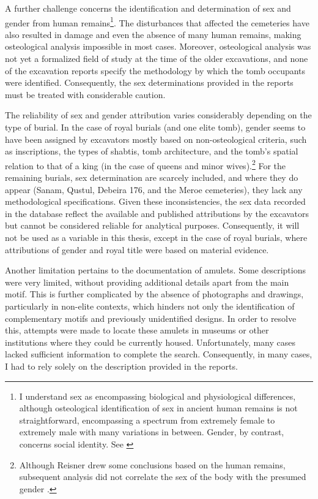 A further challenge concerns the identification and determination of sex and gender from human remains\footnote{I understand sex as encompassing biological and physiological differences, although osteological identification of sex in ancient human remains is not straightforward, encompassing a spectrum from extremely female to extremely male with many variations in between. Gender, by contrast, concerns social identity. See \textcite[p.~385-398]{whiteHumanBoneManual2005}}. The disturbances that affected the cemeteries have also resulted in damage and even the absence of many human remains, making osteological analysis impossible in most cases. Moreover, osteological analysis was not yet a formalized field of study at the time of the older excavations, and none of the excavation reports specify the methodology by which the tomb occupants were identified. Consequently, the sex determinations provided in the reports must be treated with considerable caution. 


The reliability of sex and gender attribution varies considerably depending on the type of burial. In the case of royal burials (and one elite tomb), gender seems to have been assigned by excavators mostly based on non-osteological criteria, such as inscriptions, the types of shabtis, tomb architecture, and the tomb's spatial relation to that of a king (in the case of queens and minor wives).\footnote{Although Reisner drew some conclusions based on the human remains, subsequent analysis did not correlate the sex of the body with the presumed gender \parencite{beckDemographicDataHuman1999}.} For the remaining burials, sex determination are scarcely included, and where they do appear (Sanam, Qustul, Debeira 176, and the Meroe cemeteries), they lack any methodological specifications. Given these inconsistencies, the sex data recorded in the database reflect the available and published attributions by the excavators but cannot be considered reliable for analytical purposes. Consequently, it will not be used as a variable in this thesis, except in the case of royal burials, where attributions of gender and royal title were based on material evidence.


Another limitation pertains to the documentation of amulets. Some descriptions were very limited, without providing additional details apart from the main motif. This is further complicated by the absence of photographs and drawings, particularly in non-elite contexts, which hinders not only the identification of complementary motifs and previously unidentified designs. In order to resolve this, attempts were made to locate these amulets in museums or other institutions where they could be currently housed. Unfortunately, many cases lacked sufficient information to complete the search. Consequently, in many cases, I had to rely solely on the description provided in the reports.


